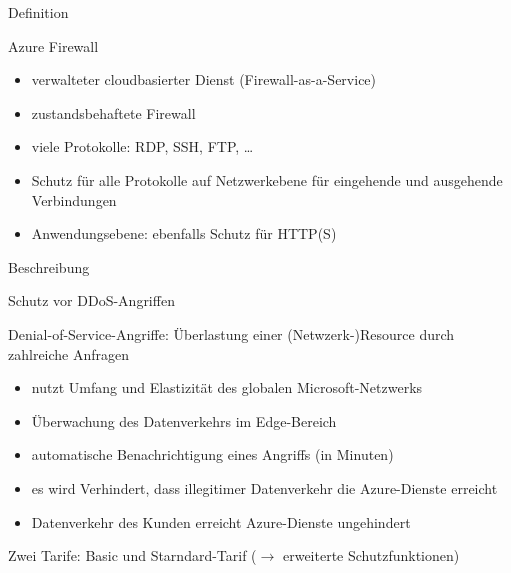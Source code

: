 \documentclass{scrartcl}
\newenvironment{flashcard}[2][]{%
    #1
    \vfill
    \centerline{\Large{#2}}
    \vfill
\newpage
}
{\newpage}
\begin{document}
    \begin{flashcard}[Definition]{Azure Firewall}
        \begin{itemize}
            \item verwalteter cloudbasierter Dienst (Firewall-as-a-Service)
            \item zustandsbehaftete Firewall
            \item viele Protokolle: RDP, SSH, FTP, \ldots
            \item Schutz für alle Protokolle auf Netzwerkebene für eingehende und ausgehende Verbindungen
            \item Anwendungsebene: ebenfalls Schutz für HTTP(S)
        \end{itemize}

    \end{flashcard}

    \begin{flashcard}[Beschreibung]{Schutz vor DDoS-Angriffen}
        Denial-of-Service-Angriffe: Überlastung einer (Netwzerk-)Resource durch zahlreiche Anfragen
        \begin{itemize}
            \item nutzt Umfang und Elastizität des globalen Microsoft-Netzwerks
            \item Überwachung des Datenverkehrs im Edge-Bereich
            \item automatische Benachrichtigung eines Angriffs (in Minuten)
            \item es wird Verhindert, dass illegitimer Datenverkehr die Azure-Dienste erreicht
            \item Datenverkehr des Kunden erreicht Azure-Dienste ungehindert
        \end{itemize}
        Zwei Tarife: Basic und Starndard-Tarif ($\rightarrow$ erweiterte Schutzfunktionen)
    \end{flashcard}
\end{document}
